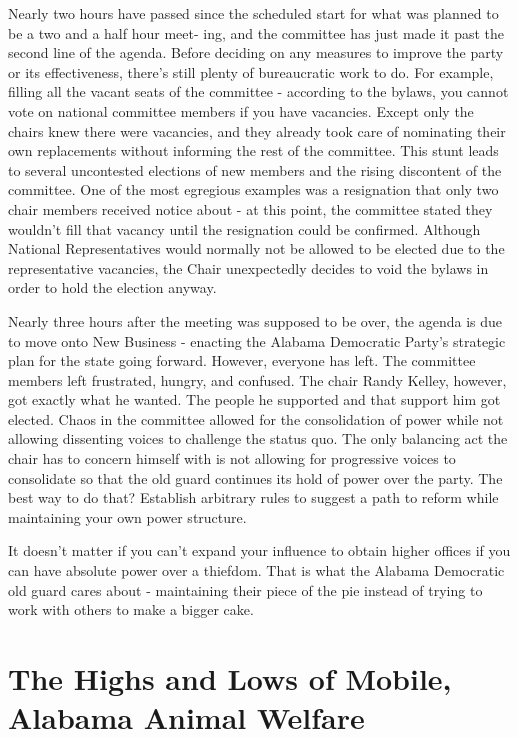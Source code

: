 \documentclass[
]{book}
\begin{document}
Nearly two hours have passed since the scheduled start for what was planned to be a two and a half hour meet- ing, and the committee has just made it past the second line of the agenda. Before deciding on any measures to improve the party or its effectiveness, there's still plenty of bureaucratic work to do. For example, filling all the vacant seats of the committee - according to the bylaws, you cannot vote on national committee members if you have vacancies. Except only the chairs knew there were vacancies, and they already took care of nominating their own replacements without informing the rest of the committee. This stunt leads to several uncontested elections of new members and the rising discontent of the committee. One of the most egregious examples was a resignation that only two chair members received notice about - at this point, the committee stated they wouldn't fill that vacancy until the resignation could be confirmed. Although National Representatives would normally not be allowed to be elected due to the representative vacancies, the Chair unexpectedly decides to void the bylaws in order to hold the election anyway.

Nearly three hours after the meeting was supposed to be over, the agenda is due to move onto New Business - enacting the Alabama Democratic Party's strategic plan for the state going forward. However, everyone has left. The committee members left frustrated, hungry, and confused. The chair Randy Kelley, however, got exactly what he wanted. The people he supported and that support him got elected. Chaos in the committee allowed for the consolidation of power while not allowing dissenting voices to challenge the status quo. The only balancing act the chair has to concern himself with is not allowing for progressive voices to consolidate so that the old guard continues its hold of power over the party. The best way to do that? Establish arbitrary rules to suggest a path to reform while maintaining your own power structure.

It doesn't matter if you can't expand your influence to obtain higher offices if you can have absolute power over a thiefdom. That is what the Alabama Democratic old guard cares about - maintaining their piece of the pie instead of trying to work with others to make a bigger cake.

\section*{The Highs and Lows of Mobile, Alabama Animal Welfare}\label{the-highs-and-lows-of-mobile-alabama-animal-welfare}
\end{document}

